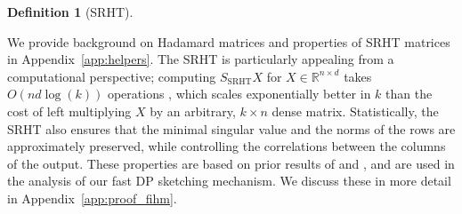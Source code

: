 \documentclass[11pt]{article}
\theoremstyle{definition}
\newtheorem{defn}{Definition}
\theoremstyle{plain}
\providecommand{\appendixref}[1]{Appendix~\ref{#1}}
\newcommand{\reals}{\mathbb{R}}
\providecommand{\brI}{\mathbb{I}}
\newcommand{\simiid}{\overset{\mathrm{iid}}{\sim}}
\begin{document}
\begin{defn}[SRHT]
\end{defn}

We provide background on Hadamard matrices and properties of SRHT matrices in \appendixref{app:helpers}.
The SRHT is particularly appealing from a computational perspective; computing \(S_{\mathrm{SRHT}}X\) for \(X \in \reals^{n \times d}\) takes \(O(nd \log(k))\) operations \citep{ailon2009fast}, which scales exponentially better in \(k\) than the cost of left multiplying \(X\) by an arbitrary, $k\times n$ dense matrix. Statistically, the SRHT also ensures that the minimal singular value and the norms of the rows are approximately preserved, while controlling the correlations between the columns of the output.
These properties are based on prior results of \citet{pilanci2015randomized} and \citet{cohen2016optimal_amm}, and are used in the analysis of our fast DP sketching mechanism. We discuss these in more detail in \appendixref{app:proof_fihm}. 
\end{document}
